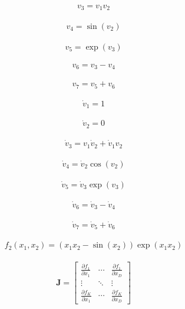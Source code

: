\documentclass{article}
\begin{document}
\begin{align*}
v_3 = v_1 v_2 \tag{8.52}
\end{align*}

\begin{align*}
v_4 = \sin(v_2) \tag{8.53}
\end{align*}

\begin{align*}
v_5 = \exp(v_3) \tag{8.54}
\end{align*}

\begin{align*}
v_6 = v_3 - v_4 \tag{8.55}
\end{align*}

\begin{align*}
v_7 = v_5 + v_6 \tag{8.56}
\end{align*}

\begin{align*}
\dot{v}_1 = 1 \tag{8.58}
\end{align*}

\begin{align*}
\dot{v}_2 = 0 \tag{8.59}
\end{align*}

\begin{align*}
\dot{v}_3 = v_1 \dot{v}_2 + \dot{v}_1 v_2 \tag{8.60}
\end{align*}

\begin{align*}
\dot{v}_4 = \dot{v}_2 \cos(v_2) \tag{8.61}
\end{align*}

\begin{align*}
\dot{v}_5 = \dot{v}_3 \exp(v_3) \tag{8.62}
\end{align*}

\begin{align*}
\dot{v}_6 = \dot{v}_3 - \dot{v}_4 \tag{8.63}
\end{align*}

\begin{align*}
\dot{v}_7 = \dot{v}_5 + \dot{v}_6 \tag{8.64}
\end{align*}

\begin{align*}
f_2(x_1, x_2) = (x_1 x_2 - \sin(x_2)) \exp(x_1 x_2) \tag{8.65}
\end{align*}

\begin{align*}
\mathbf{J} =
\begin{bmatrix}
\frac{\partial f_1}{\partial x_1} & \cdots & \frac{\partial f_1}{\partial x_D} \\
\vdots & \ddots & \vdots \\
\frac{\partial f_K}{\partial x_1} & \cdots & \frac{\partial f_K}{\partial x_D}
\end{bmatrix} \tag{8.66}
\end{align*}
\end{document}
